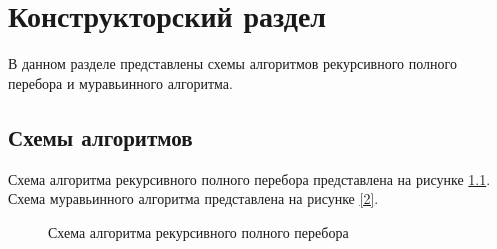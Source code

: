 \chapter{Конструкторский раздел}
В данном разделе представлены схемы алгоритмов рекурсивного полного перебора и муравьинного алгоритма.

\section{Схемы алгоритмов}
Схема алгоритма рекурсивного полного перебора представлена  на рисунке \ref{1}.
Схема муравьинного алгоритма представлена  на рисунке \ref{2}.

\begin{figure}
	\caption{Схема алгоритма рекурсивного полного перебора}
	\label{1}
\end{figure}

